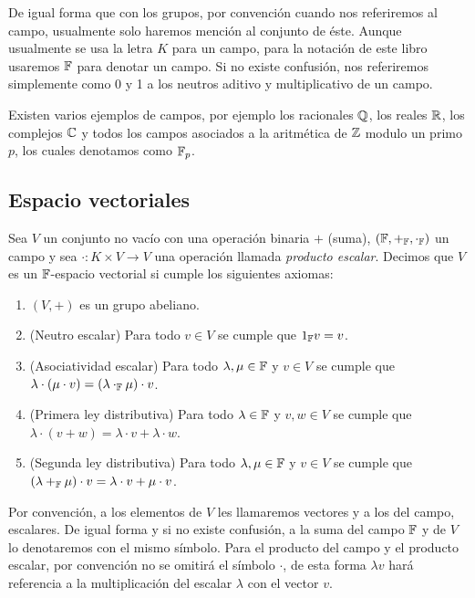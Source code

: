 De igual forma que con los grupos, por convención cuando nos referiremos al campo, usualmente solo haremos mención al conjunto de éste. Aunque usualmente se usa la letra $K$ para un campo, para la notación de este libro usaremos $\mathbb{F}$ para denotar un campo. Si no existe confusión, nos referiremos simplemente como 0 y 1 a los neutros aditivo y multiplicativo de un campo.

Existen varios ejemplos de campos, por ejemplo los racionales $\mathbb{Q}$, los reales $\mathbb{R}$, los complejos $\mathbb{C}$ y todos los campos asociados a la aritmética de $\mathbb{Z}$ modulo un primo $p$, los cuales denotamos como $\mathbb{F}_p$.

\subsection{Espacio vectoriales}

\begin{defi}
  Sea $V$ un conjunto no vacío con una operación binaria $+$ (suma), $(\mathbb{F}, +_{\mathbb{F}}, \cdot_{\mathbb{F}} )$ un campo y sea $\cdot\colon K \times V \to V$ una operación llamada \emph{producto escalar}. Decimos que $V$ es un $\mathbb{F}$-espacio vectorial si cumple los siguientes axiomas:
  \begin{enumerate}
    \item $(V, +)$ es un grupo abeliano.
    \item (Neutro escalar) Para todo $v \in V$ se cumple que $1_{\mathbb{F}} v = v$.
    \item (Asociatividad escalar) Para todo $\lambda, \mu \in \mathbb{F}$ y $v \in V$ se cumple que $\lambda \cdot (\mu \cdot v) = (\lambda \cdot_{\mathbb{F}} \mu)  \cdot v$.
    \item (Primera ley distributiva) Para todo $\lambda \in \mathbb{F}$ y $v,w \in V$ se cumple que $\lambda \cdot (v + w) = \lambda \cdot v + \lambda \cdot w$.
    \item (Segunda ley distributiva) Para todo $\lambda, \mu \in \mathbb{F}$ y $v\in V$ se cumple que $(\lambda +_{\mathbb{F}} \mu)\cdot v = \lambda \cdot v + \mu \cdot v$.
  \end{enumerate}
\end{defi}


Por convención, a los elementos de $V$ les llamaremos vectores y a los del campo, escalares. De igual forma y si no existe confusión, a la suma del campo $\mathbb{F}$ y de $V$ lo denotaremos con el mismo símbolo. Para el producto del campo y el producto escalar, por convención no se omitirá el símbolo $\cdot$, de esta forma $\lambda v$ hará referencia a la multiplicación del escalar $\lambda$ con el vector $v$.

